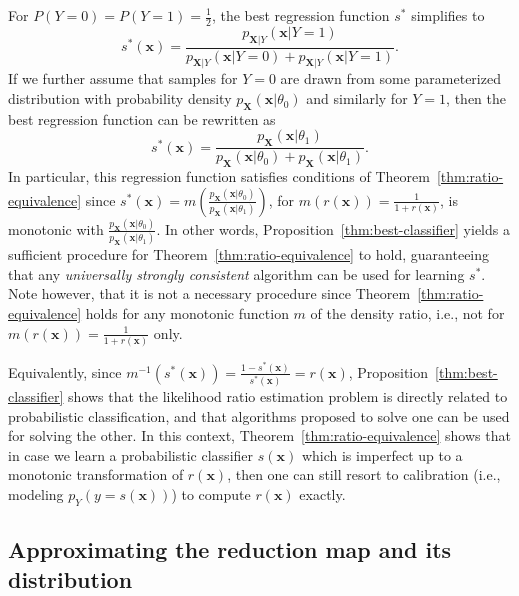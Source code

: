 \documentclass[12pt]{article}
\numberwithin{equation}{section}
\theoremstyle{plain}
\begin{document}
For $P(Y=0)=P(Y=1)=\frac{1}{2}$, the best regression function $s^*$ simplifies
to
\begin{equation}
s^*(\mathbf{x}) = \frac{p_{\mathbf{X}|Y}(\mathbf{x}|Y=1)}{p_{\mathbf{X}|Y}(\mathbf{x} | Y=0) + p_{\mathbf{X}|Y}(\mathbf{x} | Y=1)}.
\end{equation}
If we further assume that samples for $Y=0$ are drawn from some parameterized
distribution with probability density $p_{\mathbf{X}}(\mathbf{x}|\theta_0)$
and similarly for $Y=1$, then the best regression function can be rewritten
as
\begin{equation}
s^*(\mathbf{x}) = \frac{p_{\mathbf{X}}(\mathbf{x}|\theta_1)}{p_{\mathbf{X}}(\mathbf{x} | \theta_0) + p_{\mathbf{X}}(\mathbf{x} | \theta_1)}.
\end{equation}
In particular, this regression function satisfies conditions of
Theorem~\ref{thm:ratio-equivalence} since $s^*(\mathbf{x}) =
m(\frac{p_\mathbf{X}(\mathbf{x}|\theta_0)}{p_\mathbf{X}(\mathbf{x}|\theta_1)})$,
for $m(r(\mathbf{x})) = \frac{1}{1 + r(\mathbf{x})}$, is monotonic with
$\frac{p_\mathbf{X}(\mathbf{x}|\theta_0)}{p_\mathbf{X}(\mathbf{x}|\theta_1)}$.
In other words, Proposition~\ref{thm:best-classifier} yields a sufficient
procedure for Theorem~\ref{thm:ratio-equivalence} to hold, guaranteeing that any
{\it universally strongly consistent} algorithm can be used for learning $s^*$.
Note however, that it is not a necessary procedure since
Theorem~\ref{thm:ratio-equivalence} holds for any monotonic function $m$ of the
density ratio, i.e., not for $m(r(\mathbf{x})) = \frac{1}{1 +
r(\mathbf{x})}$ only.

Equivalently, since $m^{-1}(s^*(\mathbf{x})) = \frac{1 -
s^*(\mathbf{x})}{s^*(\mathbf{x})} = r(\mathbf{x})$,
Proposition~\ref{thm:best-classifier} shows that the likelihood ratio estimation
problem is directly related to probabilistic classification, and that algorithms
proposed to solve one can be used for solving the other. In this context,
Theorem~\ref{thm:ratio-equivalence} shows that in case we learn a probabilistic
classifier $s(\mathbf{x})$ which is imperfect up to a monotonic transformation
of $r(\mathbf{x})$, then one can still resort to calibration (i.e., modeling
$p_Y(y=s(\mathbf{x}))$) to compute $r(\mathbf{x})$ exactly.

\subsection{Approximating the reduction map and its distribution}
\end{document}
